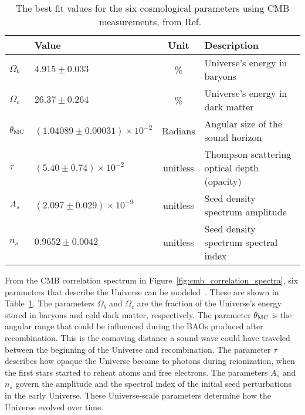 \begin{table}[t]
  \centering
  \begin{tabular}{llcl}
               & \textbf{Value}                 & \textbf{Unit} & \textbf{Description} \\
    \hline 
    $\Omega_b$ & $ 4.915  \pm0.033                 $ & \%       & Universe's energy in baryons \\
    $\Omega_c$ & $ 26.37  \pm0.264                 $ & \%       & Universe's energy in dark matter \\
    $\theta_{\textrm{MC}}$ & $(1.04089\pm0.00031)\times 10^{-2}$ & Radians  & Angular size of the sound horizon \\
    $\tau$     & $(5.40   \pm0.74   )\times 10^{-2}$ & unitless & Thompson scattering optical depth (opacity)\\
    $A_s$      & $(2.097  \pm0.029  )\times 10^{-9}$ & unitless & Seed density spectrum amplitude \\
    $n_s$      & $ 0.9652 \pm0.0042                $ & unitless & Seed density spectrum spectral index \\
    \hline 
  \end{tabular}
  \caption[6 Cosmological Parameters]{
    The best fit values for the six cosmological parameters using CMB measurements, from Ref.~\cite{planck_dm_limit}}
  \label{tab:six_params}
\end{table}

From the CMB correlation spectrum in Figure~\ref{fig:cmb_correlation_spectra}, six parameters that describe the Universe can be modeled~\cite{planck_dm_limit,planck_2013_parameters}.
These are shown in Table~\ref{tab:six_params}.
The parameters $\Omega_b$ and $\Omega_c$ are the fraction of the Universe's energy stored in baryons and cold dark matter, respectively.
The parameter $\theta_{\textrm{MC}}$ is the angular range that could be influenced during the BAOs produced after recombination.
This is the comoving distance a sound wave could have traveled between the beginning of the Universe and recombination.
The parameter $\tau$ describes how opaque the Universe became to photons during reionization, when the first stars started to reheat atoms and free electrons.
The parameters $A_s$ and $n_s$ govern the amplitude and the spectral index of the initial seed perturbations in the early Universe.
These Universe-scale parameters determine how the Universe evolved over time.

